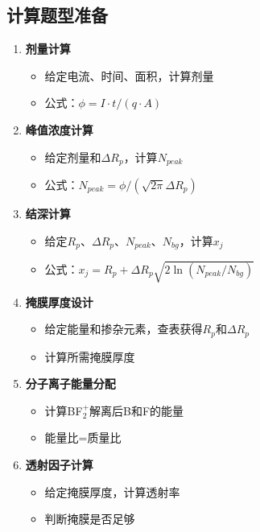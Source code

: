 \documentclass[UTF8,12pt,a4paper]{ctexart}
\begin{document}
\subsection{计算题型准备}

\begin{enumerate}
    \item \textbf{剂量计算}
    \begin{itemize}
        \item 给定电流、时间、面积，计算剂量
        \item 公式：$\phi = I \cdot t / (q \cdot A)$
    \end{itemize}
    
    \item \textbf{峰值浓度计算}
    \begin{itemize}
        \item 给定剂量和$\Delta R_p$，计算$N_{peak}$
        \item 公式：$N_{peak} = \phi / (\sqrt{2\pi}\Delta R_p)$
    \end{itemize}
    
    \item \textbf{结深计算}
    \begin{itemize}
        \item 给定$R_p$、$\Delta R_p$、$N_{peak}$、$N_{bg}$，计算$x_j$
        \item 公式：$x_j = R_p + \Delta R_p\sqrt{2\ln(N_{peak}/N_{bg})}$
    \end{itemize}
    
    \item \textbf{掩膜厚度设计}
    \begin{itemize}
        \item 给定能量和掺杂元素，查表获得$R_p$和$\Delta R_p$
        \item 计算所需掩膜厚度
    \end{itemize}
    
    \item \textbf{分子离子能量分配}
    \begin{itemize}
        \item 计算BF$_2^+$解离后B和F的能量
        \item 能量比=质量比
    \end{itemize}
    
    \item \textbf{透射因子计算}
    \begin{itemize}
        \item 给定掩膜厚度，计算透射率
        \item 判断掩膜是否足够
    \end{itemize}
\end{enumerate}
\end{document}
